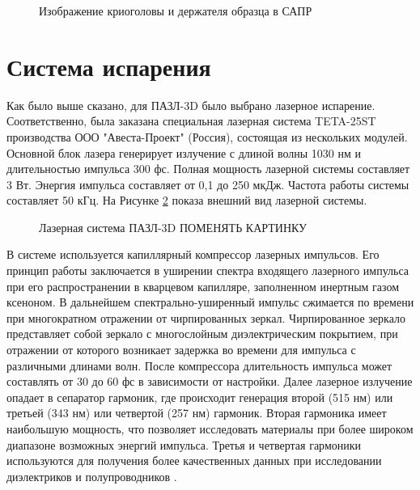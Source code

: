\begin{figure}[htb]
	\caption{Изображение криоголовы и держателя образца в САПР}
	\label{fig:APPLE_cryosystem}
\end{figure}

\FloatBarrier

\section{Система испарения}\label{sec:ch2/sec3}

Как было выше сказано, для ПАЗЛ-3D было выбрано лазерное испарение. Соответственно, была заказана специальная лазерная система TETA-25ST производства ООО "Авеста-Проект" (Россия), состоящая из нескольких модулей. Основной блок лазера генерирует излучение с длиной волны 1030 нм и длительностью импульса 300 фс. Полная мощность лазерной системы составляет 3 Вт. Энергия импульса составляет от 0,1 до 250 мкДж. Частота работы системы составляет 50 кГц. На Рисунке \cref{fig:APPLE_lasersystem} показа внешний вид лазерной системы.

\begin{figure}[htb]
	\caption{Лазерная система ПАЗЛ-3D ПОМЕНЯТЬ КАРТИНКУ}
	\label{fig:APPLE_lasersystem}
\end{figure}

В системе используется капиллярный компрессор лазерных импульсов. Его принцип работы заключается в уширении спектра входящего лазерного импульса при его распространении в кварцевом капилляре, заполненном инертным газом ксеноном. В дальнейшем спектрально-уширенный импульс сжимается по времени при многократном отражении от чирпированных зеркал. Чирпированное зеркало представляет собой зеркало с многослойным диэлектрическим покрытием, при отражении от которого возникает задержка во времени для импульса с различными длинами волн. После компрессора длительность импульса может составлять от 30 до 60 фс в зависимости от настройки. Далее лазерное излучение опадает в сепаратор гармоник, где происходит генерация второй (515 нм) или третьей (343 нм) или четвертой (257 нм) гармоник. Вторая гармоника имеет наибольшую мощность, что позволяет исследовать материалы при более широком диапазоне возможных энергий импульса. Третья и четвертая гармоники используются для получения более качественных данных при исследовании диэлектриков и полупроводников \cite{Gault06}.

